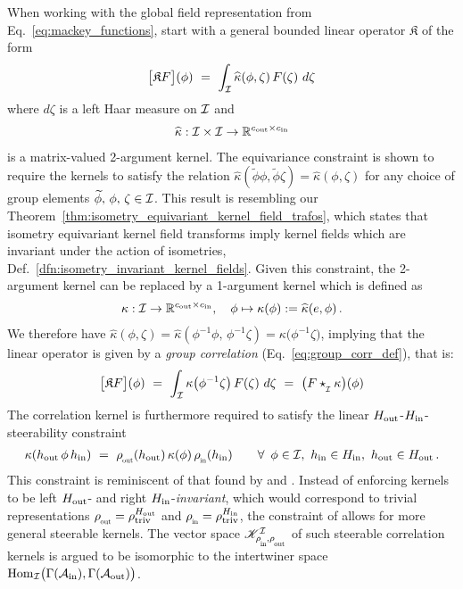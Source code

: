 When working with the global field representation from Eq.~\eqref{eq:mackey_functions}, \citet{Cohen2018-intertwiners}\cite{Cohen2019-generaltheory} start with a general bounded linear operator $\mathfrak{K}$ of the form
\begin{align}\label{eq:general_linear_map_mackey}
    \big[\mathfrak{K} F \big](\phi) \ =\ 
    \int_{\I} \widehat{\kappa} (\phi,\zeta)\, F(\zeta)\ d\zeta
\end{align}
where $d\zeta$ is a left Haar measure on $\mathcal{I}$ and
\begin{align}
    \widehat{\kappa}: \mathcal{I}\times\mathcal{I} \to \mathbb{R}^{{c_\textup{out}}\times{c_\textup{in}}}
\end{align}
is a matrix-valued 2-argument kernel.
The equivariance constraint is shown to require the kernels to satisfy the relation
$\widehat{\kappa} (\widetilde{\phi}\phi, \widetilde{\phi}\zeta) = \widehat{\kappa} (\phi, \zeta)$
for any choice of group elements $\widetilde{\phi},\, \phi,\, \zeta \in \mathcal{I}$.
This result is resembling our Theorem~\ref{thm:isometry_equivariant_kernel_field_trafos}, which states that isometry equivariant kernel field transforms imply kernel fields which are invariant under the action of isometries, Def.~\ref{dfn:isometry_invariant_kernel_fields}.
Given this constraint, the 2-argument kernel can be replaced by a 1-argument kernel which is defined as
\begin{align}\label{eq:one_arg_kernel_global}
    \kappa: \mathcal{I} \to \mathbb{R}^{{c_\textup{out}}\times{c_\textup{in}}},\ \ \ \phi \mapsto \kappa(\phi) := \widehat{\kappa}(e,\phi) \,.
\end{align}
We therefore have
$\widehat{\kappa}(\phi,\zeta) = \widehat{\kappa}(\phi^{-1} \phi,\, \phi^{-1}\zeta) = \kappa\big( \phi^{-1} \zeta\big)$,
implying that the linear operator is given by a \emph{group correlation} (Eq.~\eqref{eq:group_corr_def}), that is:
\begin{align}
    \big[\mathfrak{K} F \big](\phi)
    \ =\ \int_{\I} \kappa\big( \phi^{-1}\zeta \big)\, F(\zeta)\ d\zeta
    \ =\ \big(F \star_{\overset{}{\protect\scalebox{.64}{$\mkern-.5mu \I$}}} \kappa \big)(\phi)
\end{align}
The correlation kernel is furthermore required to satisfy the linear $H_{\textup{out}}$-$H_{\textup{in}}$-steerability constraint
\begin{align}\label{eq:double_steerability}
    \kappa(h_\textup{out}\, \phi\, h_\textup{in})
    \ =\ \rhoout(h_\textup{out})\, \kappa(\phi)\, \rhoin(h_\textup{in})
    \qquad \forall\,\ \phi\in\I,\ h_\textup{in}\in\Hin,\ h_\textup{out}\in\Hout \,.
\end{align}
This constraint is reminiscent of that found by \citet{Kondor2018-GENERAL} and \citet{bekkers2020bspline}.
Instead of enforcing kernels to be left $H_{\textup{out}}$- and right $H_{\textup{in}}$-\emph{invariant},
which would correspond to trivial representations $\rhoout=\rho_\textup{triv}^{\Hout}$ and $\rhoin=\rho_\textup{triv}^{\Hin}$,
the constraint of \citet{Cohen2018-intertwiners}\cite{Cohen2019-generaltheory} allows for more general steerable kernels.
The vector space $\mathscr{K}^{\I}_{\rhoin\mkern-1mu,\rhoout}$ of such steerable correlation kernels is argued to be isomorphic to the intertwiner space $\operatorname{Hom}_{\mathcal{I}}\! \big( \Gamma(\mathcal{A}_\textup{in}), \Gamma(\mathcal{A}_\textup{out}) \big)$.






